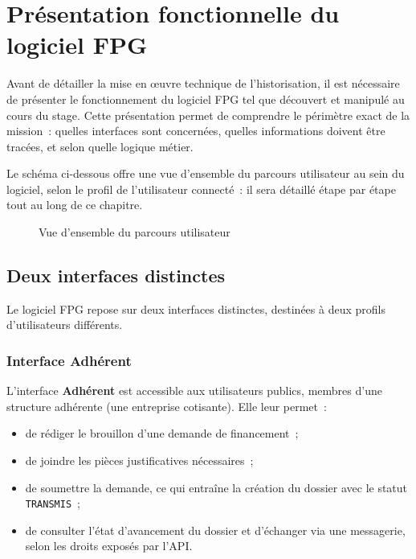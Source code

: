 
\chapter{Présentation fonctionnelle du logiciel FPG}
\label{chap:presentation}

Avant de détailler la mise en œuvre technique de l'historisation, il est
nécessaire de présenter le fonctionnement du logiciel FPG tel que
découvert et manipulé au cours du stage. Cette présentation permet de
comprendre le périmètre exact de la mission~: quelles interfaces sont
concernées, quelles informations doivent être tracées, et selon quelle
logique métier.

Le schéma ci-dessous offre une vue d'ensemble du parcours utilisateur au
sein du logiciel, selon le profil de l'utilisateur connecté~: il sera
détaillé étape par étape tout au long de ce chapitre.

\begin{figure}[H]
  \centering
  \caption{Vue d'ensemble du parcours utilisateur}
  \label{fig:parcours-utilisateur}
\end{figure}

\section{Deux interfaces distinctes}

Le logiciel FPG repose sur deux interfaces distinctes, destinées à deux
profils d'utilisateurs différents.

\subsection{Interface Adhérent}

L'interface \textbf{Adhérent} est accessible aux utilisateurs publics,
membres d'une structure adhérente (une entreprise cotisante). Elle leur
permet~:

\begin{itemize}
  \item de rédiger le brouillon d'une demande de financement~;
  \item de joindre les pièces justificatives nécessaires~;
  \item de soumettre la demande, ce qui entraîne la création du dossier
        avec le statut \texttt{TRANSMIS}~;
  \item de consulter l'état d'avancement du dossier et d'échanger via une
        messagerie, selon les droits exposés par l'API.
\end{itemize}

